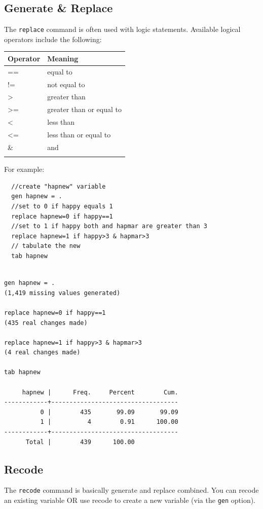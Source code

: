 \documentclass[]{book}
\begin{document}
\subsection{Generate \& Replace}\label{generate-replace}

The \texttt{replace} command is often used with logic statements.
Available logical operators include the following:

\begin{longtable}[]{@{}ll@{}}
\toprule
Operator & Meaning\tabularnewline
\midrule
\endhead
== & equal to\tabularnewline
!= & not equal to\tabularnewline
\textgreater{} & greater than\tabularnewline
\textgreater{}= & greater than or equal to\tabularnewline
\textless{} & less than\tabularnewline
\textless{}= & less than or equal to\tabularnewline
\& & and\tabularnewline
&\tabularnewline
\bottomrule
\end{longtable}

For example:

\begin{verbatim}
  //create "hapnew" variable
  gen hapnew = .
  //set to 0 if happy equals 1
  replace hapnew=0 if happy==1 
  //set to 1 if happy both and hapmar are greater than 3
  replace hapnew=1 if happy>3 & hapmar>3 
  // tabulate the new 
  tab hapnew
\end{verbatim}

\begin{verbatim}

gen hapnew = .
(1,419 missing values generated)

replace hapnew=0 if happy==1 
(435 real changes made)

replace hapnew=1 if happy>3 & hapmar>3 
(4 real changes made)

tab hapnew

     hapnew |      Freq.     Percent        Cum.
------------+-----------------------------------
          0 |        435       99.09       99.09
          1 |          4        0.91      100.00
------------+-----------------------------------
      Total |        439      100.00
\end{verbatim}

\subsection{Recode}\label{recode}

The \texttt{recode} command is basically generate and replace combined.
You can recode an existing variable OR use recode to create a new
variable (via the \texttt{gen} option).
\end{document}
